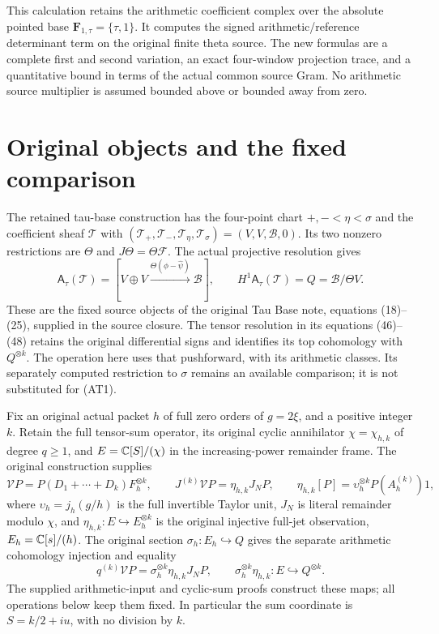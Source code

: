 This calculation retains the arithmetic coefficient complex over the
absolute pointed base $\mathbf F_{1,\tau}=\{\tau,1\}$. It computes the
signed arithmetic/reference determinant term on the original finite
theta source. The new formulas are a complete first and second variation,
an exact four-window projection trace, and a quantitative bound in terms
of the actual common source Gram. No arithmetic source multiplier is
assumed bounded above or bounded away from zero.

\section{Original objects and the fixed comparison}

The retained tau-base construction has the four-point chart
$+,-<\eta<\sigma$ and the coefficient sheaf $\mathcal T$ with
$(\mathcal T_+,\mathcal T_-,\mathcal T_\eta,\mathcal T_\sigma)
=(V,V,\mathscr B,0)$. Its two nonzero restrictions are $\Theta$ and
$J\Theta=\Theta\mathcal F$. The actual projective resolution gives
\[
 \mathsf A_\tau(\mathcal T)
 =[V\oplus V\xrightarrow{\Theta(\phi-\widehat\psi)}\mathscr B],
 \qquad H^1\mathsf A_\tau(\mathcal T)=Q=\mathscr B/\Theta V.
 \tag{AT1}
\]
These are the fixed source objects of the original Tau Base note,
equations (18)--(25), supplied in the source closure. The tensor
resolution in its equations (46)--(48) retains the original differential
signs and identifies its top cohomology with $Q^{\otimes k}$.
The operation here uses that pushforward, with its arithmetic classes.
Its separately computed restriction to $\sigma$ remains an available
comparison; it is not substituted for (AT1).

Fix an original actual packet $h$ of full zero orders of $g=2\xi$,
and a positive integer $k$. Retain the full tensor-sum operator,
its original cyclic annihilator $\chi=\chi_{h,k}$ of degree $q\ge1$,
and $E=\mathbb C[S]/(\chi)$ in the increasing-power remainder frame.
The original construction supplies
\[
 \mathcal V P=P(D_1+\cdots+D_k)F_h^{\otimes k},\qquad
 J^{(k)}\mathcal V P=\eta_{h,k}J_NP,\qquad
 \eta_{h,k}[P]=\upsilon_h^{\otimes k}P(A_h^{(k)})1,
 \tag{AT2}
\]
where $\upsilon_h=j_h(g/h)$ is the full invertible Taylor unit,
$J_N$ is literal remainder modulo $\chi$, and
$\eta_{h,k}:E\hookrightarrow E_h^{\otimes k}$ is the original
injective full-jet observation, $E_h=\mathbb C[s]/(h)$.
The original section $\sigma_h:E_h\hookrightarrow Q$ gives the
separate arithmetic cohomology injection and equality
\[
 q^{(k)}\mathcal V P=\sigma_h^{\otimes k}\eta_{h,k}J_NP,
 \qquad \sigma_h^{\otimes k}\eta_{h,k}:E\hookrightarrow Q^{\otimes k}.
 \tag{AT2a}
\]
The supplied arithmetic-input and cyclic-sum proofs construct these
maps; all operations below keep them fixed. In
particular the sum coordinate is $S=k/2+iu$, with no division by $k$.

